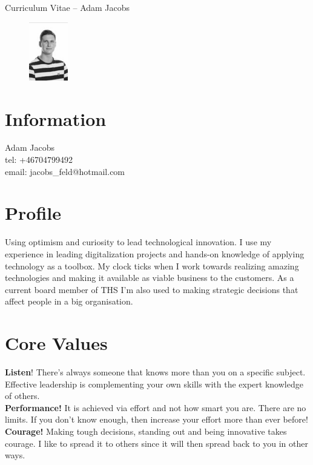 \documentclass[margin,line,a4paper]{resume}
\begin{document}
{\sc \Large Curriculum Vitae -- Adam Jacobs}
\begin{resume}
    \vspace{0.01cm}
    \begin{figure}
        \vspace{-1cm}
       \begin{center}
       \includegraphics[width=0.15\textwidth]{adamjacobs}
       \end{center}
        \vspace{-1cm}
    \end{figure}
    
    \section{\mysidestyle Information}%
    Adam Jacobs \\
    tel: +46704799492 \\
    email: jacobs\_feld@hotmail.com
    \href{} \\

\section{\mysidestyle Profile}\vspace{1mm}
Using optimism and curiosity to lead technological innovation. I use my experience in leading digitalization projects and hands-on knowledge of applying technology as a toolbox. My clock ticks when I work towards realizing amazing technologies and making it available as viable business to the customers. As a current board member of THS I'm also used to making strategic decisions that affect people in a big organisation.

\section{\mysidestyle Core Values}\vspace{1mm}
    \textbf{Listen}! There's always someone that knows more than you on a specific subject. Effective leadership is complementing your own skills with the expert knowledge of others.
    \\
     \textbf{Performance!} It is achieved via effort and not how smart you are. There are no limits. If you don't know enough, then increase your effort more than ever before!
    \\
    \textbf{Courage!} Making tough decisions, standing out and being innovative takes courage. I like to spread it to others since it will then spread back to you in other ways. 


\end{resume}
\end{document}
